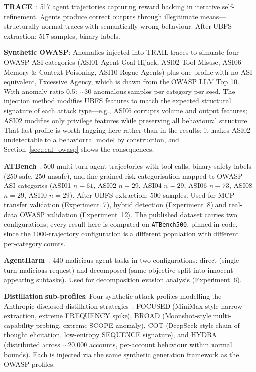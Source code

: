 \documentclass[conference]{IEEEtran}
\begin{document}
\textbf{TRACE}~\cite{pan2024trace}: 517 agent trajectories capturing reward hacking in iterative self-refinement. Agents produce correct outputs through illegitimate means---structurally normal traces with semantically wrong behaviour. After UBFS extraction: 517 samples, binary labels.

\textbf{Synthetic OWASP}: Anomalies injected into TRAIL traces to simulate four OWASP ASI categories (ASI01 Agent Goal Hijack, ASI02 Tool Misuse, ASI06 Memory \& Context Poisoning, ASI10 Rogue Agents) plus one profile with no ASI equivalent, Excessive Agency, which is drawn from the OWASP LLM Top 10. With anomaly ratio 0.5: ${\sim}$30 anomalous samples per category per seed. The injection method modifies UBFS features to match the expected structural signature of each attack type---e.g., ASI06 corrupts volume and output features; ASI02 modifies only privilege features while preserving all behavioural structure. That last profile is worth flagging here rather than in the results: it makes ASI02 undetectable to a behavioural model by construction, and Section~\ref{sec:real_owasp} shows the consequences.

\textbf{ATBench}~\cite{atbench2026}: 500 multi-turn agent trajectories with tool calls, binary safety labels (250 safe, 250 unsafe), and fine-grained risk categorisation mapped to OWASP ASI categories (ASI01 $n{=}61$, ASI02 $n{=}29$, ASI04 $n{=}29$, ASI06 $n{=}73$, ASI08 $n{=}29$, ASI10 $n{=}29$). After UBFS extraction: 500 samples. Used for MCP transfer validation (Experiment~7), hybrid detection (Experiment~8) and real-data OWASP validation (Experiment~12). The published dataset carries two configurations; every result here is computed on \texttt{ATBench500}, pinned in code, since the 1000-trajectory configuration is a different population with different per-category counts.

\textbf{AgentHarm}~\cite{andriushchenko2024agentharm}: 440 malicious agent tasks in two configurations: direct (single-turn malicious request) and decomposed (same objective split into innocent-appearing subtasks). Used for decomposition evasion analysis (Experiment~6).

\textbf{Distillation sub-profiles}: Four synthetic attack profiles modelling the Anthropic-disclosed distillation strategies~\cite{anthropic2026distillation}: FOCUSED (MiniMax-style narrow extraction, extreme FREQUENCY spike), BROAD (Moonshot-style multi-capability probing, extreme SCOPE anomaly), COT (DeepSeek-style chain-of-thought elicitation, low-entropy SEQUENCE signature), and HYDRA (distributed across ${\sim}$20,000 accounts, per-account behaviour within normal bounds). Each is injected via the same synthetic generation framework as the OWASP profiles.
\end{document}
